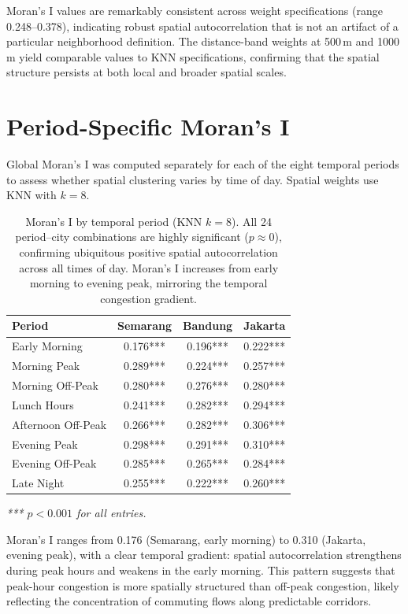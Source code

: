 \documentclass[preprint,12pt]{elsarticle}
\begin{document}
Moran's I values are remarkably consistent across weight specifications (range 0.248--0.378), indicating robust spatial autocorrelation that is not an artifact of a particular neighborhood definition. The distance-band weights at 500\,m and 1000\,m yield comparable values to KNN specifications, confirming that the spatial structure persists at both local and broader spatial scales.

\section{Period-Specific Moran's I}
\label{sec:s2}

Global Moran's I was computed separately for each of the eight temporal periods to assess whether spatial clustering varies by time of day. Spatial weights use KNN with $k{=}8$.

\begin{table}[!htbp]
\centering
\caption{Moran's I by temporal period (KNN $k{=}8$). All 24 period--city combinations are highly significant ($p \approx 0$), confirming ubiquitous positive spatial autocorrelation across all times of day. Moran's I increases from early morning to evening peak, mirroring the temporal congestion gradient.}
\label{tab:s2}
\begin{tabular}{lccc}
\toprule
Period & Semarang & Bandung & Jakarta \\
\midrule
Early Morning      & 0.176*** & 0.196*** & 0.222*** \\
Morning Peak      & 0.289*** & 0.224*** & 0.257*** \\
Morning Off-Peak  & 0.280*** & 0.276*** & 0.280*** \\
Lunch Hours       & 0.241*** & 0.282*** & 0.294*** \\
Afternoon Off-Peak& 0.266*** & 0.282*** & 0.306*** \\
Evening Peak      & 0.298*** & 0.291*** & 0.310*** \\
Evening Off-Peak  & 0.285*** & 0.265*** & 0.284*** \\
Late Night        & 0.255*** & 0.222*** & 0.260*** \\
\bottomrule
\end{tabular}

\smallskip
\noindent\textit{*** $p < 0.001$ for all entries.}
\end{table}

Moran's I ranges from 0.176 (Semarang, early morning) to 0.310 (Jakarta, evening peak), with a clear temporal gradient: spatial autocorrelation strengthens during peak hours and weakens in the early morning. This pattern suggests that peak-hour congestion is more spatially structured than off-peak congestion, likely reflecting the concentration of commuting flows along predictable corridors.
\end{document}
